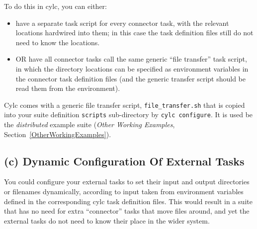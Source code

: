 \documentclass[11pt,a4paper]{article}
\begin{document}
To do this in cylc, you can either:

\begin{itemize}
    \item have a separate task script for every connector task, with the
        relevant locations hardwired into them; in this case the task
        definition files still do not need to know the locations.
    \item OR have all connector tasks call the same generic ``file
        transfer'' task script, in which the directory locations can be
        specified as environment variables in the connector task
        definition files (and the generic transfer script should be read
        them from the environment).
\end{itemize}

Cylc comes with a generic file transfer script, \lstinline=file_transfer.sh= that
is copied into your suite definition \lstinline=scripts= sub-directory 
by \lstinline=cylc configure=. It is used be the {\em distributed}
example suite ({\em Other Working Examples}, Section~\ref{OtherWorkingExamples}).

\subsection{(c) Dynamic Configuration Of External Tasks}

You could configure your external tasks to set their input and output
directories or filenames dynamically, according to input taken from
environment variables defined in the corresponding cylc task definition
files. This would result in a suite that has no need for extra
``connector'' tasks that move files around, and yet the external tasks
do not need to know their place in the wider system.

%
\end{document}
